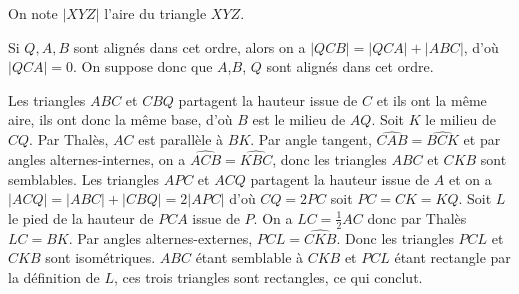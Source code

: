 On note $|XYZ|$ l'aire du triangle $XYZ$.

Si $Q, A, B$ sont alignés dans cet ordre, alors on a $|QCB| = |QCA| + |ABC|$, d'où $|QCA| = 0$. On suppose donc que $A$,$B$, $Q$ sont alignés dans cet ordre.

Les triangles $ABC$ et $CBQ$ partagent la hauteur issue de $C$ et ils ont la même aire, ils ont donc la même base, d'où $B$ est le milieu de $AQ$. Soit $K$ le milieu de $CQ$. Par Thalès, $AC$ est parallèle à $BK$. Par angle tangent, $\widehat{CAB} = \widehat{BCK}$ et par angles alternes-internes, on a $\widehat{ACB} = \widehat{KBC}$, donc les triangles $ABC$ et $CKB$ sont semblables. Les triangles $APC$ et $ACQ$ partagent la hauteur issue de $A$ et on a $|ACQ| = |ABC| + |CBQ| = 2|APC|$ d'où $CQ = 2PC$ soit $PC = CK = KQ$. Soit $L$ le pied de la hauteur de $PCA$ issue de $P$. On a $LC = \frac12 AC$ donc par Thalès $LC = BK$. Par angles alternes-externes, $\widehat{PCL} = \widehat{CKB}$. Donc les triangles $PCL$ et $CKB$ sont isométriques. $ABC$ étant semblable à $CKB$ et $PCL$ étant rectangle par la définition de $L$, ces trois triangles sont rectangles, ce qui conclut.